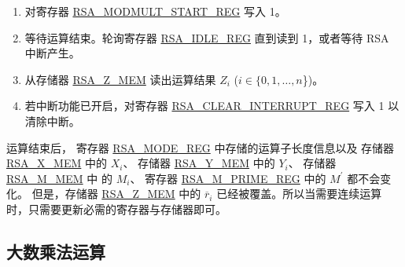\documentclass[main\_\_CN.tex]{subfiles}
\begin{document}
\begin{enumerate}
    \item 对寄存器 \hyperref[regdesc:RSAMODMULTSTARTREG]{RSA\_MODMULT\_START\_REG} 写入 1。

    \item 等待运算结束。轮询寄存器 \hyperref[regdesc:RSAIDLEREG]{RSA\_IDLE\_REG} 直到读到 1，或者等待 RSA 中断产生。

    \item 从存储器 \hyperref[regdesc:RSAmemory]{RSA\_Z\_MEM} 读出运算结果 \begin{math}Z_{i}\end{math} (\begin{math}i \in \{ 0, 1, \dots, n \end{math}\})。

    \item 若中断功能已开启，对寄存器 \hyperref[regdesc:RSACLEARINTERRUPTREG]{RSA\_CLEAR\_INTERRUPT\_REG} 写入 1 以清除中断。

\end{enumerate}


运算结束后，
寄存器 \hyperref[regdesc:RSAMODEREG]{RSA\_MODE\_REG} 中存储的运算子长度信息以及
存储器 \hyperref[regdesc:RSAmemory]{RSA\_X\_MEM} 中的 \begin{math}X_{i}\end{math}、
存储器 \hyperref[regdesc:RSAmemory]{RSA\_Y\_MEM} 中的 \begin{math}Y_{i}\end{math}、
存储器 \hyperref[regdesc:RSAmemory]{RSA\_M\_MEM} 中 的 \begin{math}M_{i}\end{math}、
寄存器 \hyperref[regdesc:RSAMPRIMEREG]{RSA\_M\_PRIME\_REG} 中的 \begin{math}M^{\prime}\end{math} 都不会变化。
但是，存储器 \hyperref[regdesc:RSAmemory]{RSA\_Z\_MEM} 中的 \begin{math}\overline{r}_{i}\end{math}
已经被覆盖。所以当需要连续运算时，只需要更新必需的寄存器与存储器即可。


\subsection{大数乘法运算}
\end{document}
